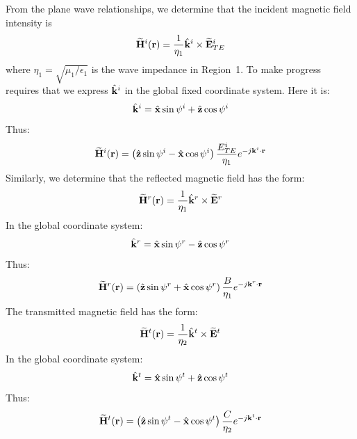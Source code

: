 From the plane wave relationships, we determine that the incident magnetic field intensity is
%
\begin{equation}
\widetilde{\bf H}^i({\bf r}) = \frac{1}{\eta_1} \hat{\bf k}^i \times \widetilde{\bf E}^i_{TE}              
\label{m0167_eHi}
\end{equation}
%
where $\eta_1=\sqrt{\mu_1 / \epsilon_1}$ is the wave impedance in Region~1.  
%
To make progress requires that we express $\hat{\bf k}^i$ in the global fixed coordinate system.  Here it is:
%
\begin{equation}
\hat{\bf k}^i = \hat{\bf x}\sin\psi^i + \hat{\bf z}\cos\psi^i 
\end{equation}
%
Thus:
%
\begin{equation}
\widetilde{\bf H}^i({\bf r}) = \left( \hat{\bf z}\sin\psi^i - \hat{\bf x}\cos\psi^i \right) \frac{E^i_{TE}}{\eta_1}  e^{-j{\bf k}^i\cdot{\bf r}}          
\label{m0167_eHi2}
\end{equation}
%
Similarly, we determine that the reflected magnetic field has the form:
%
\begin{equation}
\widetilde{\bf H}^r({\bf r}) = \frac{1}{\eta_1} \hat{\bf k}^r \times \widetilde{\bf E}^r              
\label{m0167_eHr}
\end{equation}
%
In the global coordinate system:
%
\begin{equation}
\hat{\bf k}^r = \hat{\bf x}\sin\psi^r - \hat{\bf z}\cos\psi^r 
\label{m0167_ehkr}
\end{equation}
%
Thus:
%
\begin{equation}
\widetilde{\bf H}^r({\bf r}) = \left( \hat{\bf z}\sin\psi^r + \hat{\bf x}\cos\psi^r \right) \frac{B}{\eta_1}  e^{-j{\bf k}^r\cdot{\bf r}}          
\label{m0167_eHr2}
\end{equation}
%
The transmitted magnetic field has the form:
%
\begin{equation}
\widetilde{\bf H}^t({\bf r}) = \frac{1}{\eta_2} \hat{\bf k}^t \times \widetilde{\bf E}^t              
\label{m0167_eHt}
\end{equation}
%
In the global coordinate system:
%
\begin{equation}
\hat{\bf k}^t = \hat{\bf x}\sin\psi^t + \hat{\bf z}\cos\psi^t 
\label{m0167_ehkt}
\end{equation}
%
Thus:
%
\begin{equation}
\widetilde{\bf H}^t({\bf r}) = \left( \hat{\bf z}\sin\psi^t - \hat{\bf x}\cos\psi^t \right) \frac{C}{\eta_2}  e^{-j{\bf k}^t\cdot{\bf r}}          
\label{m0167_eHt2}
\end{equation}
